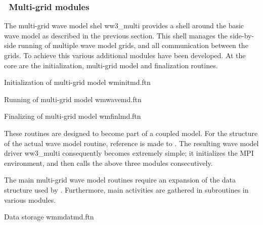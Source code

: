 \vsssub
\subsubsection{~Multi-grid modules} \label{sec:multi_mod}
\vsssub

The multi-grid wave model shel {\file ww3\_multi} provides a shell around the
basic wave model as described in the previous section. This shell manages the
side-by-side running of multiple wave model grids, and all communication
between the grids. To achieve this various additional modules have been
developed. At the core are the initialization, multi-grid model and
finalization routines.

\vspace{\baselineskip} \noindent
Initialization of multi-grid model \hfill {\file wminitmd.ftn}

\begin{flisti}
\end{flisti}

\noindent
Running of multi-grid model \hfill {\file wmwavemd.ftn}

\begin{flisti}
\end{flisti}

\noindent
Finalizing of multi-grid model \hfill {\file wmfinlmd.ftn}

\begin{flisti}
\end{flisti}

\noindent
These routines are designed to become part of a coupled model. For the
structure of the actual wave model routine, reference is made to
\cite{tol:MMAB07b}. The resulting wave model driver {\file ww3\_multi}
consequently becomes extremely simple; it initializes the MPI environment,
and then calls the above three modules consecutively. 

The main multi-grid wave model routines require an expansion of the data
structure used by \ws. Furthermore, main activities are gathered in
subroutines in various modules.

\vspace{\baselineskip} \noindent
Data storage \hfill {\file wmmdatmd.ftn}

\begin{flisti}
\end{flisti}

